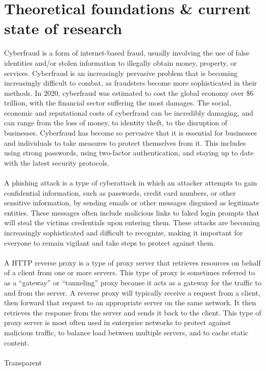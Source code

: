 \documentclass[12pt]{scrbook}
\begin{document}
\section{Theoretical foundations \& current state of research} Cyberfraud is a
form of internet-based fraud, usually involving the use of false identities
and/or stolen information to illegally obtain money, property, or services.
Cyberfraud is an increasingly pervasive problem that is becoming increasingly
difficult to combat, as fraudsters become more sophisticated in their methods.
In 2020, cyberfraud was estimated to cost the global economy over \$6
trillion\cite{6trillion}, with the financial sector suffering the most damages.
The social, economic and reputational costs of cyberfraud can be incredibly
damaging, and can range from the loss of money, to identity theft, to the
disruption of businesses. Cyberfraud has become so pervasive that it is
essential for businesses and individuals to take measures to protect themselves
from it. This includes using strong passwords, using two-factor authentication,
and staying up to date with the latest security protocols.\\ \\ A phishing
attack is a type of cyberattack in which an attacker attempts to gain
confidential information, such as passwords, credit card numbers, or other
sensitive information, by sending emails or other messages disguised as
legitimate entities. These messages often include malicious links to faked login
prompts that will steal the victims credentials upon entering them. These
attacks are becoming increasingly sophisticated and difficult to recognize,
making it important for everyone to remain vigilant and take steps to protect
against them. \\ \\ A HTTP reverse proxy is a type of proxy server that
retrieves resources on behalf of a client from one or more servers. This type of
proxy is sometimes referred to as a “gateway” or “tunneling” proxy because it
acts as a gateway for the traffic to and from the server. A reverse proxy will
typically receive a request from a client, then forward that request to an
appropriate server on the same network. It then retrieves the response from the
server and sends it back to the client. This type of proxy server is most often
used in enterprise networks to protect against malicious traffic, to balance
load between multiple servers, and to cache static content. \\ \\ Transparent
\end{document}
